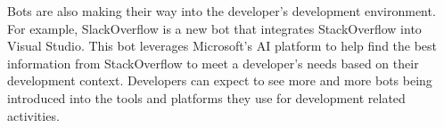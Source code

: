 \documentclass{sig-alternate}
\begin{document}
Bots are also making their way into the developer's development environment. For example, SlackOverflow is a new bot that integrates StackOverflow into Visual Studio.  This bot leverages Microsoft's AI platform to help find the best information from StackOverflow to meet a developer's needs based on their development context. 
Developers can expect to see more and more bots being introduced into the tools and platforms they use for development related activities.




%



%


%

\listoftodos
%
%
\end{document}
